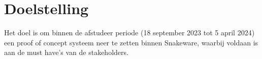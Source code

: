 \section{Doelstelling}
Het doel is om binnen de afstudeer periode (18 september 2023 tot 5 april 2024) een proof of concept systeem neer te zetten binnen Snakeware, waarbij voldaan is aan de must have's van de stakeholders.
